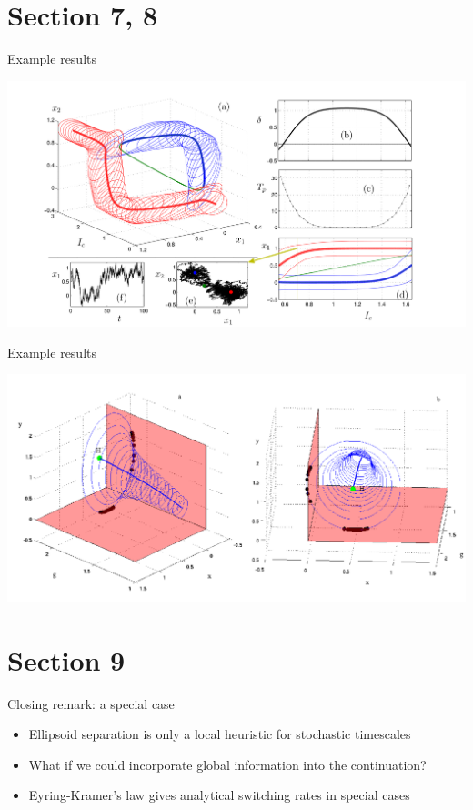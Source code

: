 \documentclass[presentation]{beamer}
\begin{document}
\section{Section 7, 8}
\label{sec:org325cbcf}
\begin{frame}[label={sec:orgb31e940}]{Example results}
\begin{center}
\includegraphics[width=.9\linewidth]{./example.png}
\end{center}
\end{frame}
\begin{frame}[label={sec:orgddca378}]{Example results}
\begin{center}
\includegraphics[width=.9\linewidth]{./hopf.png}
\end{center}
\end{frame}

\section{Section 9}
\label{sec:org56824c2}
\begin{frame}[label={sec:org0642513}]{Closing remark: a special case}
\begin{itemize}
\item Ellipsoid separation is only a local heuristic for stochastic timescales
\end{itemize}
\vfill
\begin{itemize}
\item What if we could incorporate global information into the continuation?
\end{itemize}
\vfill
\begin{itemize}
\item Eyring-Kramer's law gives analytical switching rates in special cases
\end{itemize}
\end{frame}
\end{document}
